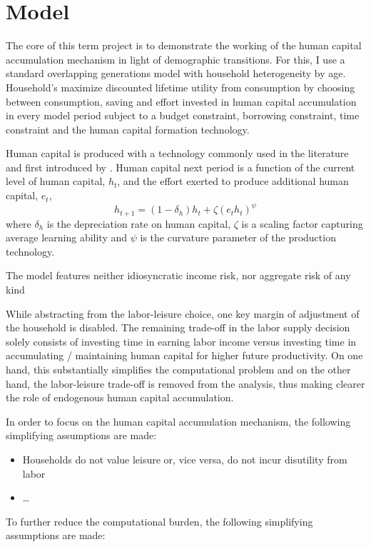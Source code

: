 \section{Model}
\label{sec:model}

The core of this term project is to demonstrate the working of the human capital accumulation mechanism in light of demographic transitions. For this, I use a standard overlapping generations model with household heterogeneity by age. Household's maximize discounted lifetime utility from consumption by choosing between consumption, saving and effort invested in human capital accumulation in every model period subject to a budget constraint, borrowing constraint, time constraint and the human capital formation technology.

Human capital is produced with a technology commonly used in the literature and first introduced by \cite{Ben-Porath1967}. Human capital next period is a function of the current level of human capital, $h_t$, and the effort exerted to produce additional human capital, $e_t$,
$$ h_{t+1} = (1-\delta_h) h_t + \zeta (e_t h_t)^\psi$$
where $\delta_h$ is the depreciation rate on human capital, $\zeta$ is a scaling factor capturing average learning ability and $\psi$ is the curvature parameter of the production technology.

The model features neither idiosyncratic income risk, nor aggregate risk of any kind

While abstracting from the labor-leisure choice, one key margin of adjustment of the household is disabled. The remaining trade-off in the labor supply decision solely consists of investing time in earning labor income versus investing time in accumulating / maintaining human capital for higher future productivity. On one hand, this substantially simplifies the computational problem and on the other hand, the labor-leisure trade-off is removed from the analysis, thus making clearer the role of endogenous human capital accumulation.


In order to focus on the human capital accumulation mechanism, the following simplifying assumptions are made:
\begin{itemize}
    \item Households do not value leisure or, vice versa, do not incur disutility from labor
    \item \dots
\end{itemize}

To further reduce the computational burden, the following simplifying assumptions are made:

